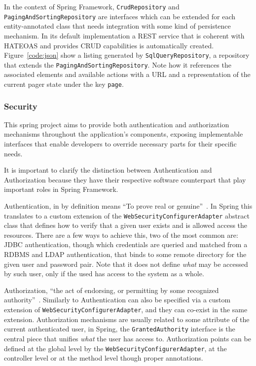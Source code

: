 In the context of Spring Framework, \texttt{CrudRepository} and \texttt{PagingAndSortingRepository} are interfaces which can be extended for each entity-annotated class that needs integration with some kind of persistence mechanism. In its default implementation a \gls{REST} service that is coherent with \gls{HATEOAS} and provides \gls{CRUD} capabilities is automatically created. Figure~\ref{code:json} show a listing generated by \texttt{SqlQueryRepository}, a repository that extends the \texttt{PagingAndSortingRepository}. Note how it references the associated elements and available actions with a \gls{URL} and a representation of the current pager state under the key \texttt{page}.

\subsubsection{Security}
This spring project aims to provide both authentication and authorization mechanisms throughout the application's components, exposing implementable interfaces that enable developers to override necessary parts for their specific needs.

It is important to clarify the distinction between Authentication and Authorization because they have their respective software counterpart that play important roles in Spring Framework.

Authentication, in by definition means ``To prove real or genuine''~\cite{merriamwebster}. In Spring this translates to a custom extension of the \texttt{WebSecurityConfigurerAdapter} abstract class that defines how to verify that a given user exists and is allowed access the resources. There are a few ways to achieve this, two of the most common are: \gls{JDBC} authentication, though which credentials are queried and matched from a \gls{RDBMS} and \gls{LDAP} authentication, that binds to some remote directory for the given user and password pair. Note that it does not define \textit{what} may be accessed by such user, only if the used has access to the system as a whole.

Authorization, ``the act of endorsing, or permitting by some recognized authority''~\cite{merriamwebster}. Similarly to Authentication can also be specified via a custom extension of \texttt{WebSecurityConfigurerAdapter}, and they can co-exist in the same extension. Authorization mechanisms are usually related to some attribute of the current authenticated user, in Spring, the \texttt{GrantedAuthority} interface is the central piece that unifies \textit{what} the user has access to. Authorization points can be defined at the global level by the \texttt{WebSecurityConfigurerAdapter}, at the controller level or at the method level though proper annotations.

